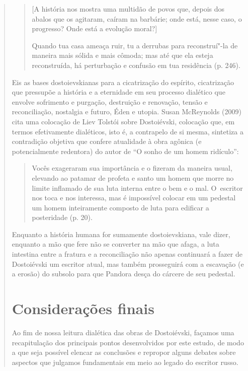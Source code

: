 {\begin{quote}
\begin{quote}
{[}A história nos mostra uma multidão de povos que, depois dos abalos
que os agitaram, caíram na barbárie; onde está, nesse caso, o progresso?
Onde está a evolução moral?{]}

Quando tua casa ameaça ruir, tu a derrubas para reconstruí"-la de maneira
mais sólida e mais cômoda; mas até que ela esteja reconstruída, há
perturbação e confusão em tua residência (p. 246).
\end{quote}

Eis as bases dostoievskianas para a cicatrização do espírito,
cicatrização que pressupõe a história e a eternidade em seu processo
dialético que envolve sofrimento e purgação, destruição e renovação,
tensão e reconciliação, nostalgia e futuro, Éden e utopia. Susan
McReynolds (2009) cita uma colocação de Liev Tolstói sobre Dostoiévski,
colocação que, em termos efetivamente dialéticos, isto é, a contrapelo
de si mesma, sintetiza a contradição objetiva que confere atualidade à
obra agônica (e potencialmente redentora) do autor de ``O sonho de um
homem ridículo'':

\begin{quote}
Vocês exageraram sua importância e o fizeram da maneira usual, elevando
ao patamar de profeta e santo um homem que morre no limite inflamado de
sua luta interna entre o bem e o mal. O~escritor nos toca e nos
interessa, mas é impossível colocar em um pedestal um homem inteiramente
composto de luta para edificar a posteridade (p. 20).
\end{quote}

Enquanto a história humana for sumamente dostoievskiana, vale dizer,
enquanto a mão que fere não se converter na mão que afaga, a luta
intestina entre a fratura e a reconciliação não apenas continuará a
fazer de Dostoiévski um escritor atual, mas também prosseguirá com a
escavação (e a erosão) do subsolo para que Pandora desça do cárcere de
seu pedestal.

\chapter*{Considerações finais}



Ao fim de nossa leitura dialética das obras de Dostoiévski, façamos uma
recapitulação dos principais pontos desenvolvidos por este estudo, de
modo a que seja possível elencar as conclusões e repropor alguns debates
sobre aspectos que julgamos fundamentais em meio ao legado do escritor
russo.


\end{quote}}
